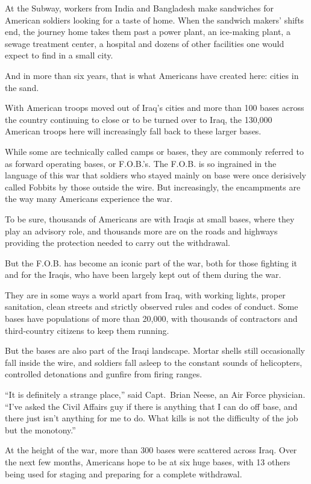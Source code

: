 ﻿\documentclass[12pt]{article}
\begin{document}
At the Subway, workers from India and Bangladesh make sandwiches for American soldiers looking for a
taste of home. When the sandwich makers' shifts end, the journey home takes them past a power plant,
an ice-making plant, a sewage treatment center, a hospital and dozens of other facilities one would
expect to find in a small city.

And in more than six years, that is what Americans have created here: cities in the sand.

With American troops moved out of Iraq's cities and more than 100 bases across the country
continuing to close or to be turned over to Iraq, the 130,000 American troops here will increasingly
fall back to these larger bases.

While some are technically called camps or bases, they are commonly referred to as forward operating
bases, or F.O.B.'s. The F.O.B. is so ingrained\cite{ingrained} in the language of this war that
soldiers who stayed mainly on base were once derisively called Fobbits by those outside the wire.
But increasingly, the encampments are the way many Americans experience the war.

To be sure, thousands of Americans are with Iraqis at small bases, where they play an advisory role,
and thousands more are on the roads and highways providing the protection needed to carry out the
withdrawal.

But the F.O.B. has become an iconic part of the war, both for those fighting it and for the Iraqis,
who have been largely kept out of them during the war.

They are in some ways a world apart from Iraq, with working lights, proper
sanitation\cite{sanitation}, clean streets and strictly observed rules and codes of conduct. Some
bases have populations of more than 20,000, with thousands of contractors and third-country citizens
to keep them running.

But the bases are also part of the Iraqi landscape. Mortar shells still occasionally fall inside the
wire, and soldiers fall asleep to the constant sounds of helicopters, controlled detonations and
gunfire from firing ranges.

``It is definitely a strange place,'' said Capt.~Brian Neese, an Air Force physician. ``I've asked
the Civil Affairs guy if there is anything that I can do off base, and there just isn't anything for
me to do. What kills is not the difficulty of the job but the monotony\cite{monotony}.''

At the height of the war, more than 300 bases were scattered across Iraq. Over the next few months,
Americans hope to be at six huge bases, with 13 others being used for staging and preparing for a
complete withdrawal.
\end{document}
